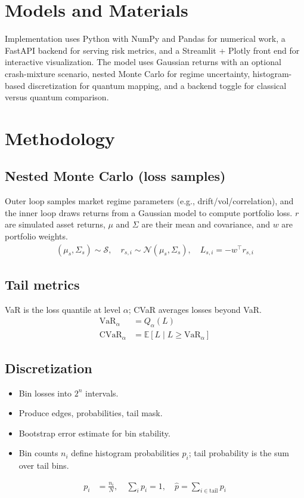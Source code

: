 \documentclass[conference]{IEEEtran}
\begin{document}
\section{Models and Materials}
Implementation uses Python with NumPy and Pandas for numerical work, a FastAPI backend for serving risk metrics, and a Streamlit + Plotly front end for interactive visualization. The model uses Gaussian returns with an optional crash-mixture scenario, nested Monte Carlo for regime uncertainty, histogram-based discretization for quantum mapping, and a backend toggle for classical versus quantum comparison.

\section{Methodology}
\subsection{Nested Monte Carlo (loss samples)}
Outer loop samples market regime parameters (e.g., drift/vol/correlation), and the inner loop draws returns from a Gaussian model to compute portfolio loss. $r$ are simulated asset returns, $\mu$ and $\Sigma$ are their mean and covariance, and $w$ are portfolio weights.
\begin{align*}
(\mu_s,\Sigma_s) \sim \mathcal{S}, \quad r_{s,i} \sim \mathcal{N}(\mu_s,\Sigma_s), \quad L_{s,i} = -w^\top r_{s,i}
\end{align*}

\subsection{Tail metrics}
VaR is the loss quantile at level $\alpha$; CVaR averages losses beyond VaR.
\begin{align*}
    \text{VaR}_{\alpha} &= Q_{\alpha}(L) \\
    \text{CVaR}_{\alpha} &= \mathbb{E}[L \mid L \ge \text{VaR}_{\alpha}]
\end{align*}

\subsection{Discretization}
\begin{itemize}
    \item Bin losses into $2^n$ intervals.
    \item Produce edges, probabilities, tail mask.
    \item Bootstrap error estimate for bin stability.
    \item Bin counts $n_i$ define histogram probabilities $p_i$; tail probability is the sum over tail bins.
\end{itemize}
\begin{align*}
    p_i &= \frac{n_i}{N}, \quad \sum_i p_i = 1, \quad \hat{p} = \sum_{i \in \text{tail}} p_i
\end{align*}
\end{document}
